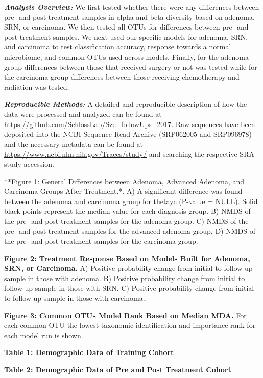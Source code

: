 \documentclass[12pt,]{article}
\begin{document}
\textbf{\emph{Analysis Overview:}} We first tested whether there were
any differences between pre- and post-treatment samples in alpha and
beta diversity based on adenoma, SRN, or carcinoma. We then tested all
OTUs for differences between pre- and post-treatment samples. We next
used our specific models for adenoma, SRN, and carcinoma to test
classification accuracy, response towards a normal microbiome, and
common OTUs used across models. Finally, for the adenoma group
differences between those that received surgery or not was tested while
for the carcinoma group differences between those receiving chemotherapy
and radiation was tested.

\textbf{\emph{Reproducible Methods:}} A detailed and reproducible
description of how the data were processed and analyzed can be found at
\url{https://github.com/SchlossLab/Sze_followUps_2017}. Raw sequences
have been deposited into the NCBI Sequence Read Archive (SRP062005 and
SRP096978) and the necessary metadata can be found at
\url{https://www.ncbi.nlm.nih.gov/Traces/study/} and searching the
respective SRA study accession.

\newpage

**Figure 1: General Differences between Adenoma, Advanced Adenoma, and
Carcinoma Groups After Treatment.*. A) A significant difference was
found between the adenoma and carcinoma group for thetayc (P-value =
NULL). Solid black points represent the median value for each diagnosis
group. B) NMDS of the pre- and post-treatment samples for the adenoma
group. C) NMDS of the pre- and post-treatment samples for the advanced
adenoma group. D) NMDS of the pre- and post-treatment samples for the
carcinoma group.

\textbf{Figure 2: Treatment Response Based on Models Built for Adenoma,
SRN, or Carcinoma.} A) Positive probability change from initial to
follow up sample in those with adenoma. B) Positive probability change
from initial to follow up sample in those with SRN. C) Positive
probability change from initial to follow up sample in those with
carcinoma..

\textbf{Figure 3: Common OTUs Model Rank Based on Median MDA.} For each
common OTU the lowest taxonomic identification and importance rank for
each model run is shown.

\newpage

\textbf{Table 1: Demographic Data of Training Cohort}

\textbf{Table 2: Demographic Data of Pre and Post Treatment Cohort}
\end{document}
